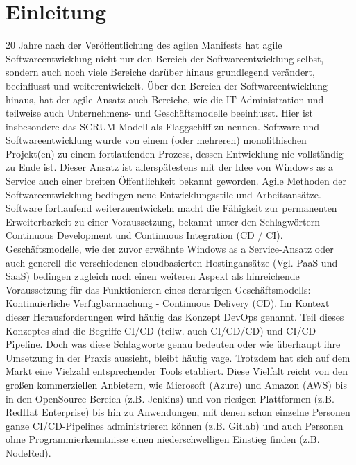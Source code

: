 \section{Einleitung}
\label{Einleitung}
20 Jahre nach der Veröffentlichung des agilen Manifests \cite{eckstein_20_2021} hat agile Softwareentwicklung nicht nur den Bereich der Softwareentwicklung selbst, sondern auch noch viele Bereiche darüber hinaus grundlegend verändert, beeinflusst und weiterentwickelt. Über den Bereich der Softwareentwicklung hinaus, hat der agile Ansatz auch Bereiche, wie die IT-Administration und teilweise auch Unternehmens- und Geschäftsmodelle beeinflusst. Hier ist insbesondere das \gls{SCRUM}-Modell als Flaggschiff zu nennen.
Software und Softwareentwicklung wurde von einem (oder mehreren) monolithischen Projekt(en) zu einem fortlaufenden Prozess, dessen Entwicklung nie vollständig zu Ende ist. Dieser Ansatz ist allerspätestens mit der Idee von \grqq{}Windows as a Service\glqq{} \cite{jaimeo_kurzanleitung_2021} auch einer breiten Öffentlichkeit bekannt geworden.\newline
Agile Methoden der Softwareentwicklung bedingen neue Entwicklungsstile und Arbeitsansätze. Software fortlaufend weiterzuentwickeln  macht die Fähigkeit zur permanenten Erweiterbarkeit zu einer Voraussetzung, bekannt unter den Schlagwörtern \glqq{} Continuous Development\grqq{} und \glqq{} Continuous Integration\grqq{}  (\acrshort{CD} / \acrshort{CI}). Geschäftsmodelle, wie der zuvor erwähnte \glqq{}Windows as a Service\grqq{}-Ansatz oder auch generell die verschiedenen cloudbasierten Hostingansätze (Vgl. \acrshort{PaaS} und \acrshort{SaaS}) bedingen zugleich noch einen weiteren Aspekt als hinreichende Voraussetzung für das Funktionieren eines derartigen Geschäftsmodells: Kontinuierliche Verfügbarmachung - \glqq{}Continuous Delivery\grqq{} (\acrshort{CD}).\newline
Im Kontext dieser Herausforderungen wird häufig das Konzept \glqq{}\gls{DevOps}\grqq{} genannt. Teil dieses Konzeptes sind die Begriffe \acrshort{CI}/\acrshort{CD} (teilw. auch \acrshort{CI}/\acrshort{CD}/\acrshort{CD}) und \acrshort{CI}/\acrshort{CD}-Pipeline.
Doch was diese Schlagworte genau bedeuten oder wie überhaupt ihre Umsetzung in der Praxis aussieht, bleibt häufig vage. Trotzdem hat sich auf dem Markt eine Vielzahl entsprechender Tools etabliert.
Diese Vielfalt reicht von den großen kommerziellen Anbietern, wie Microsoft (Azure) und Amazon (AWS) bis in den OpenSource-Bereich (z.B. Jenkins) und von riesigen Plattformen (z.B. RedHat Enterprise) bis hin zu Anwendungen, mit denen schon einzelne Personen ganze \acrshort{CI}/\acrshort{CD}-Pipelines administrieren können (z.B. Gitlab) und auch Personen ohne Programmierkenntnisse einen niederschwelligen Einstieg finden (z.B. NodeRed).